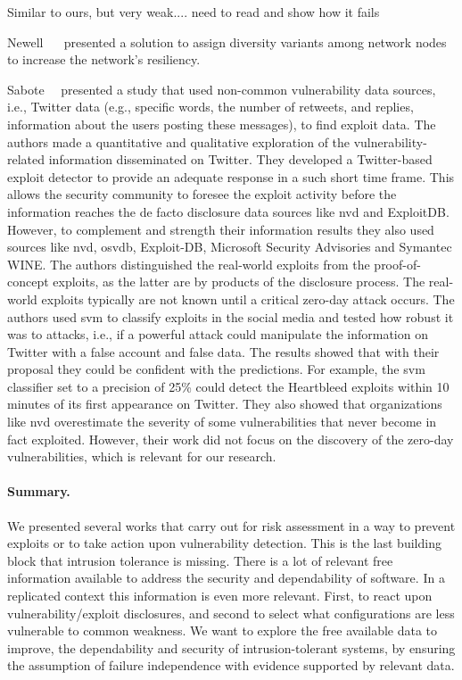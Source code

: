 Similar to ours, but very weak.... need to read and show how it fails~\cite{Mu:2014}

Newell~\etal{} ~\cite{Newell:2015} presented a solution to assign diversity variants among network nodes to increase the network's resiliency.

Sabote~\etal{}~\cite{Sabottke:2015} presented a study that used non-common vulnerability data sources, i.e., Twitter data (e.g., specific words, the number of retweets, and replies, information about
the users posting these messages), to find exploit data. 
The authors made a quantitative and qualitative exploration of the vulnerability-related information disseminated on Twitter.
They developed a Twitter-based exploit detector to provide an adequate response in a such short time frame. 
This allows the security community to foresee the exploit activity before the information reaches the de facto disclosure data sources like \gls{nvd} and ExploitDB.
However, to complement and strength their information results they also used sources like \gls{nvd}, \gls{osvdb}, Exploit-DB, Microsoft Security Advisories and Symantec WINE. 
The authors distinguished the real-world exploits from the proof-of-concept exploits, as the latter are by products of the disclosure process. 
The real-world exploits typically are not known until a critical zero-day attack occurs. 
The authors used \gls{svm} to classify exploits in the social media and tested how robust it was to attacks, i.e., if a powerful attack could manipulate the information on Twitter with a false account and false data. 
The results showed that with their proposal they could be confident with the predictions. 
For example, the \gls{svm} classifier set to a precision of 25\% could detect the Heartbleed exploits within 10 minutes of its first appearance on Twitter. 
They also showed that organizations like \gls{nvd} overestimate the severity of some vulnerabilities that never become in fact exploited.
However, their work did not focus on the discovery of the zero-day vulnerabilities, which is relevant for our research.




\paragraph{Summary.} We presented several works that carry out for risk assessment in a way to prevent exploits or to take action upon vulnerability detection. 
This is the last building block that intrusion tolerance is missing. 
There is a lot of relevant free information available to address the security and dependability of software. 
In a replicated context this information is even more relevant. 
First, to react upon vulnerability/exploit disclosures, and second to select what configurations are less vulnerable to common weakness. 
We want to explore the free available data to improve, the dependability and security of intrusion-tolerant systems, by ensuring the assumption of failure independence with evidence supported by  relevant data.



